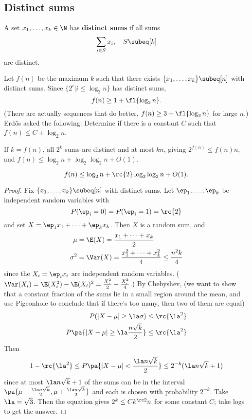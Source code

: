 
\subsection{Distinct sums}
\begin{df}
A set $x_1,\ldots, x_k\in \N$ has \textbf{distinct sums} if all sums
\[
\sum_{i\in S}x_i,\quad S\subeq [k]
\]
are distinct.
\end{df}
Let $f(n)$ be the maximum $k$ such that there exists $\{x_1,\ldots, x_k\}\subeq [n]$ with distinct sums. Since $\{2^i|i\leq \log_2 n\}$ has distinct sums,
\[
f(n)\geq 1+\fl{\log_2 n}.
\]
(There are actually sequences that do better, $f(n)\geq 3+\fl{\log_2 n}$ for large $n$.)
Erd\H{o}s asked the following: 
Determine if there is a constant $C$ such that $f(n)\leq C+\log_2 n$. 

If $k=f(n)$, all $2^k$ sums are distinct and at most $kn$, giving $2^{f(n)}\leq f(n)n$, and $f(n)\leq \log_2 n+\log_2\log_2 n+O(1)$.
\begin{thm}
\[
f(n)\leq \log_2 n+\rc{2}\log_2\log_2 n+O(1).
\]
\end{thm}
\begin{proof}
Fix $\{x_1,\ldots, x_k\}\subeq [n]$ with distinct sums. Let $\ep_1,\ldots, \ep_k$ be independent random variables with
\[
P(\ep_i=0)=P(\ep_i=1)=\rc{2}
\]
and set $X=\ep_1x_1+\cdots +\ep_kx_k$. Then $X$ is a random sum, and
\begin{align*}
\mu&=\E(X)=\frac{x_1+\cdots +x_k}{2}\\
\sigma^2&=\Var(X)=\frac{x_1^2+\cdots +x_k^2}{4}\leq \frac{n^2 k}{4}
\end{align*}
since the $X_i=\ep_ix_i$ are independent random variables. ($\Var(X_i)=\E(X_i^2)-\E(X_i)^2=\frac{X_i^2}{2}-\frac{X_i^2}{4}$.) By Chebyshev, (we want to show that a constant fraction of the sums lie in a small region around the mean, and use Pigeonhole to conclude that if there's too many, then two of them are equal)
\begin{align*}
P(|X-\mu|\geq\la\sigma)&\leq \rc{\la^2}\\
P\pa{|X-\mu|\geq\la\frac{n\sqrt k}{2}}&\leq \rc{\la^2} 
\end{align*}
Then
\[
1-\rc{\la^2}\leq P\pa{|X-\mu|<\frac{\la n\sqrt k}{2}}\leq 2^{-k} (\la n\sqrt k +1)
\]
since at most $\la n\sqrt k +1$ of the sums can be in the interval $\pa{
\mu-\frac{\la n\sqrt k}{2},\mu+\frac{\la n\sqrt k}{2}
}$ and each is chosen with probability $2^{-k}$. Take $\la=\sqrt 3$. Then the equation gives $2^k\leq Ck^{\rc 2}n$ for some constant $C$; take logs to get the answer.
\end{proof}

